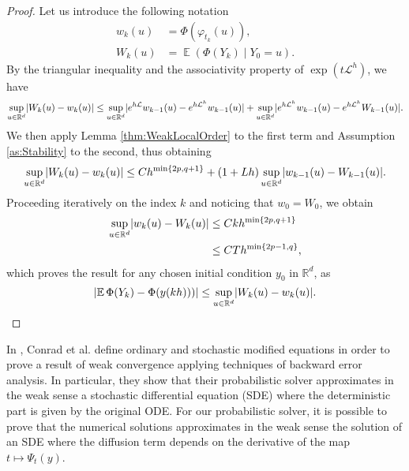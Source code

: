 \documentclass{siamart1116}
\numberwithin{theorem}{section}
\DeclarePairedDelimiter{\abs}{\lvert}{\rvert}
\renewcommand{\phi}{\varphi}
\newcommand{\R}{\mathbb{R}}
\newcommand{\diffL}{\mathcal{L}}
\newcommand{\E}{\operatorname{\mathbb{E}}}
\begin{document}
\begin{proof} Let us introduce the following notation
	\begin{equation}
		\begin{aligned}
			w_k(u) &= \Phi(\phi_{t_k}(u)),\\
			W_k(u) &= \E(\Phi(Y_k) \mid Y_0 = u).
		\end{aligned}
	\end{equation}
	By the triangular inequality and the associativity property of $\exp(t\diffL^h)$, we have
	\begin{equation}
		\begin{aligned}
			\sup_{u\in\R^d}\abs{W_k(u) - w_k(u)} \leq \sup_{u\in\R^d}\abs{e^{h\diffL}w_{k-1}(u) - e^{h\diffL^h}w_{k-1}(u)} + \sup_{u\in\R^d}\abs{e^{h\diffL^h}w_{k-1}(u) - e^{h\diffL^h}W_{k-1}(u)}.
		\end{aligned}
	\end{equation}
	We then apply Lemma \eqref{thm:WeakLocalOrder} to the first term and Assumption \ref{as:Stability} to the second, thus obtaining
	\begin{equation}
		\sup_{u\in\R^d}\abs{W_k(u) - w_k(u)} \leq Ch^{\min\{2p, q + 1\}} + (1 + Lh)\sup_{u\in\R^d}\abs{w_{k-1}(u) - W_{k-1}(u)}.
	\end{equation}
	Proceeding iteratively on the index $k$ and noticing that $w_0 = W_0$, we obtain
	\begin{equation}
		\begin{aligned}
			\sup_{u\in\R^d}\abs{w_k(u) - W_k(u)} &\leq C k h^{\min\{2p, q + 1\}}\\
			&\leq C T h^{\min\{2p - 1, q\}},	
		\end{aligned}
	\end{equation}
	which proves the result for any chosen initial condition $y_0$ in $\R^d$, as
	\begin{equation}
		\abs{\E\Phi(Y_k) - \Phi(y(kh)))} \leq \sup_{u\in\R^d}\abs{W_k(u) - w_k(u)}.
	\end{equation}
\end{proof}

\begin{remark} In \cite{CGS16}, Conrad et al. define ordinary and stochastic modified equations in order to prove a result of weak convergence applying techniques of backward error analysis. In particular, they show that their probabilistic solver approximates in the weak sense a stochastic differential equation (SDE) where the deterministic part is given by the original ODE. For our probabilistic solver, it is possible to prove that the numerical solutions approximates in the weak sense the solution of an SDE where the diffusion term depends on the derivative of the map $t \mapsto \Psi_t(y)$.
\end{remark}
\end{document}
